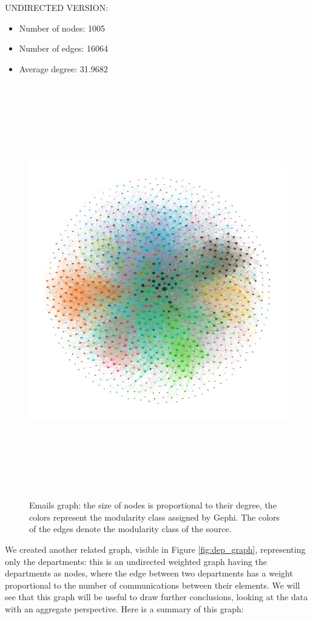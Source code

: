 \documentclass{report}
\theoremstyle{definition}
\theoremstyle{remark}
\begin{document}
UNDIRECTED VERSION:

\begin{itemize}
	\item Number of nodes: 1005
	\item Number of edges: 16064
	\item Average degree: 31.9682
\end{itemize}

\begin{figure} [H]
	\centering
	\centerline{\includegraphics[width = 24cm, height = 18cm, keepaspectratio]{eMail_graph.png}}
	\caption{Emails graph: the size of nodes is proportional to their degree, the colors represent the modularity class assigned by Gephi. The colors of the edges denote the modularity class of the source.} \label{fig:mail_graph}
\end{figure}

We created another related graph, visible in Figure \ref{fig:dep_graph}, representing only the departments: this is an undirected weighted graph having the departments as nodes, where the edge between two departments has a weight proportional to the number of communications between their elements. We will see that this graph will be useful to draw further conclusions, looking at the data with an aggregate perspective. Here is a summary of this graph:
\end{document}
